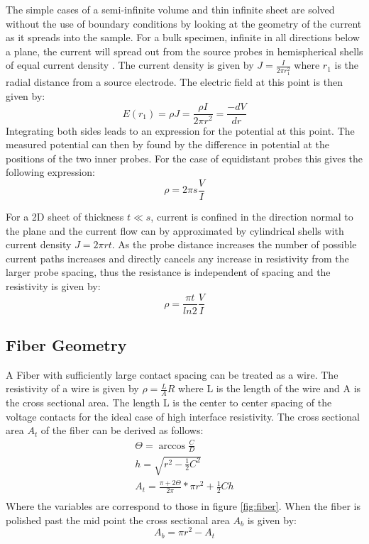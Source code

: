    The simple cases of a semi-infinite volume and thin infinite sheet are solved without the use of boundary conditions by looking at the geometry of the current as it spreads into the sample. For a bulk specimen, infinite in all directions below a plane, the current will spread out from the source probes in hemispherical shells of equal current density \cite{Miccoli2015TheSystems}.
    The current density is given by $J=\frac{I}{2 \pi r^2_1}$ where $r_1$ is the radial distance from a source electrode. The electric field at this point is then given by:
    \begin{equation}
    E(r_1) = \rho J = \frac{\rho I}{2 \pi r^2}=\frac{-dV}{dr}
    \end{equation}
    Integrating both sides leads to an expression for the potential at this point. The measured potential can then by found by the difference in potential at the positions of the two inner probes. For the case of equidistant probes this gives the following expression:
    \begin{equation}
        \rho = 2 \pi s\frac{V}{I}
    \end{equation}
    
    For a 2D sheet of thickness $t \ll s$, current is confined in the direction normal to the plane and the current flow can by approximated by cylindrical shells with current density $J=2 \pi rt$. As the probe distance increases the number of possible current paths increases and directly cancels any increase in resistivity from the larger probe spacing, thus the resistance is independent of spacing and the resistivity is given by: 
    \begin{equation}
        \rho = \frac{\pi t}{ln2}\frac{V}{I}
    \end{equation}
  
  
\subsection{Fiber Geometry}
A Fiber with sufficiently large contact spacing can be treated as a wire. The resistivity of a wire is given by $\rho = \frac{L}{A}R$
where L is the length of the wire and A is the cross sectional area. The length L is the center to center spacing of the voltage contacts for the ideal case of high interface resistivity. The cross sectional area $A_t$ of the fiber can be derived as follows: \begin{align}
\Theta = \arccos{\frac{C}{D}}    \\
h = \sqrt{r^2-\frac{1}{2}C^2} \\
    A_t = \frac{\pi+2\Theta}{2\pi}*\pi r^2 + \frac{1}{2}Ch\\
\end{align}    
Where the variables are correspond to those in figure \ref{fig:fiber}.
When the fiber is polished past the mid point the cross sectional area $A_b$ is given by: \begin{equation}
    A_b = \pi r^2 -A_t
\end{equation}

